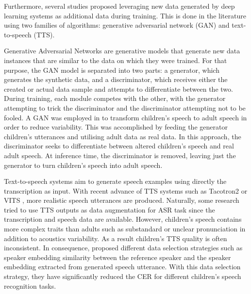 Furthermore, several studies proposed leveraging new data generated by deep learning systems as additional data during training. This is done in the literature using two families of algorithms: generative adversarial network (GAN) and text-to-speech (TTS). 


Generative Adversarial Networks are generative models that generate new data instances that are similar to the data on which they were trained. For that purpose, the GAN model is separated into two parts: a generator, which generates the synthetic data, and a discriminator, which receives either the created or actual data sample and attempts to differentiate between the two. During training, each module competes with the other, with the generator attempting to trick the discriminator and the discriminator attempting not to be fooled. A GAN was employed in \cite{GANS} to transform children's speech to adult speech in order to reduce variability. This was accomplished by feeding the generator children's utterances and utilising adult data as real data. In this approach, the discriminator seeks to differentiate between altered children's speech and real adult speech. At inference time, the discriminator is removed, leaving just the generator to turn children's speech into adult speech.


Text-to-speech systems aim to generate speech examples using directly the transcription as input. With recent advance of TTS systems such as Tacotron2 \cite{shen2018natural} or VITS \cite{kim2021conditional}, more realistic speech utterances are produced. Naturally, some research tried to use TTS outputs as data augmentation for ASR task \cite{laptev2020you} since the transcription and speech data are available. However, children's speech contains more complex traits than adults such as substandard or unclear pronunciation in addition to acoustics variability. As a result children's TTS quality is often inconsistent. In consequence, \cite{wang2021towards} proposed different data selection strategies such as speaker embedding similarity between the reference speaker and the speaker embedding extracted from generated speech utterance. With this data selection strategy, they have significantly reduced the CER for different children's speech recognition tasks.


